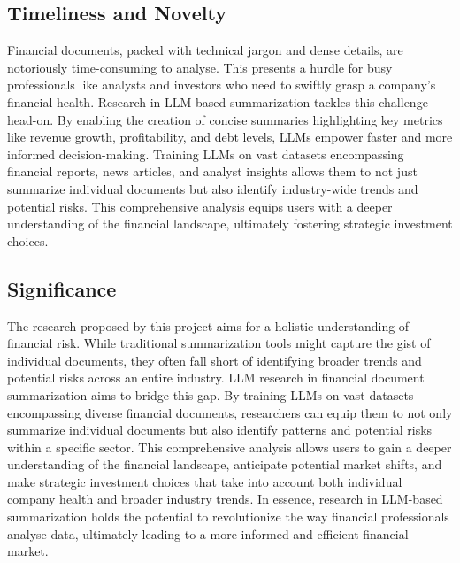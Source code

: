 \subsection{Timeliness and Novelty}\label{subsec:timeliness-and-novelty}



Financial documents, packed with technical jargon and dense details, are notoriously time-consuming to analyse.
This presents a hurdle for busy professionals like analysts and investors who need to swiftly grasp a company's
financial health.
Research in LLM-based summarization tackles this challenge head-on.
By enabling the creation of concise summaries highlighting key metrics like revenue growth, profitability, and debt
levels, LLMs empower faster and more informed decision-making.
Training LLMs on vast datasets encompassing financial reports, news articles, and analyst insights allows them to not
just summarize individual documents but also identify industry-wide trends and potential risks.
This comprehensive analysis equips users with a deeper understanding of the financial landscape, ultimately fostering
strategic investment choices.

\subsection{Significance}\label{subsec:significance}


The research proposed by this project aims for a holistic understanding of financial risk.
While traditional summarization tools might capture the gist of individual documents, they often fall short of
identifying broader trends and potential risks across an entire industry.
LLM research in financial document summarization aims to bridge this gap.
By training LLMs on vast datasets encompassing diverse financial documents, researchers can equip them to not only
summarize individual documents but also identify patterns and potential risks within a specific sector.
This comprehensive analysis allows users to gain a deeper understanding of the financial landscape, anticipate
potential market shifts, and make strategic investment choices that take into account both individual company health
and broader industry trends.
In essence, research in LLM-based summarization holds the potential to revolutionize the way financial professionals
analyse data, ultimately leading to a more informed and efficient financial market.

